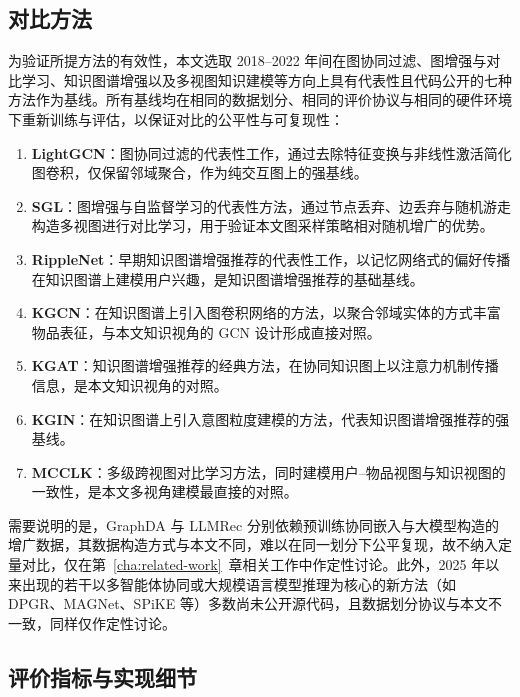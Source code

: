\subsection{对比方法}
\label{subsec:graph-baselines}

为验证所提方法的有效性，本文选取 2018--2022 年间在图协同过滤、图增强与对比学习、知识图谱增强以及多视图知识建模等方向上具有代表性且代码公开的七种方法作为基线。所有基线均在相同的数据划分、相同的评价协议与相同的硬件环境下重新训练与评估，以保证对比的公平性与可复现性：

\begin{enumerate}
  \item \textbf{LightGCN}\cite{he2020lightgcn}：图协同过滤的代表性工作，通过去除特征变换与非线性激活简化图卷积，仅保留邻域聚合，作为纯交互图上的强基线。
  \item \textbf{SGL}\cite{wu2021sgl}：图增强与自监督学习的代表性方法，通过节点丢弃、边丢弃与随机游走构造多视图进行对比学习，用于验证本文图采样策略相对随机增广的优势。
  \item \textbf{RippleNet}\cite{wang2018ripplenet}：早期知识图谱增强推荐的代表性工作，以记忆网络式的偏好传播在知识图谱上建模用户兴趣，是知识图谱增强推荐的基础基线。
  \item \textbf{KGCN}\cite{wang2019kgcn}：在知识图谱上引入图卷积网络的方法，以聚合邻域实体的方式丰富物品表征，与本文知识视角的 GCN 设计形成直接对照。
  \item \textbf{KGAT}\cite{wang2019kgat}：知识图谱增强推荐的经典方法，在协同知识图上以注意力机制传播信息，是本文知识视角的对照。
  \item \textbf{KGIN}\cite{wang2021kgin}：在知识图谱上引入意图粒度建模的方法，代表知识图谱增强推荐的强基线。
  \item \textbf{MCCLK}\cite{zou2022mcclk}：多级跨视图对比学习方法，同时建模用户--物品视图与知识视图的一致性，是本文多视角建模最直接的对照。
\end{enumerate}

需要说明的是，GraphDA\cite{fan2023graphda} 与 LLMRec\cite{wei2024llmrec} 分别依赖预训练协同嵌入与大模型构造的增广数据，其数据构造方式与本文不同，难以在同一划分下公平复现，故不纳入定量对比，仅在第~\ref{cha:related-work}~章相关工作中作定性讨论。此外，2025 年以来出现的若干以多智能体协同或大规模语言模型推理为核心的新方法（如 DPGR、MAGNet、SPiKE 等）多数尚未公开源代码，且数据划分协议与本文不一致，同样仅作定性讨论。

\subsection{评价指标与实现细节}
\label{subsec:graph-metrics}

